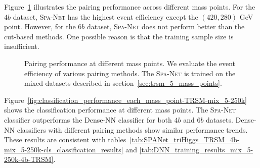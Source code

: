 \documentclass[12pt]{article}
\begin{document}
        Figure~\ref{fig:pairing_performance_each_mass_point-TRSM-mix_5-250k} illustrates the pairing performance across different mass points. For the $4b$ dataset, \textsc{Spa-Net} has the highest event efficiency except the $\left( 420, 280 \right) $ GeV point. However, for the $6b$ dataset, \textsc{Spa-Net} does not perform better than the cut-based methods. One possible reason is that the training sample size is insufficient.
        \begin{figure}[htpb]
            \centering
            \caption{Pairing performance at different mass points. We evaluate the event efficiency of various pairing methods. The \textsc{Spa-Net} is trained on the mixed datasets described in section~\ref{sec:trsm_5_mass_points}.}  
            \label{fig:pairing_performance_each_mass_point-TRSM-mix_5-250k}  
        \end{figure}

        Figure~\ref{fig:classification_performance_each_mass_point-TRSM-mix_5-250k} shows the classification performance at different mass points. The \textsc{Spa-Net} classifier outperforms the Dense-NN classifier for both $4b$ and $6b$ datasets. Dense-NN classifiers with different pairing methods show similar performance trends. These results are consistent with tables~\ref{tab:SPANet_triHiggs_TRSM_4b-mix_5-250k-cls_classification_results} and \ref{tab:DNN_training_results_mix_5-250k-4b-TRSM}.  
\end{document}
